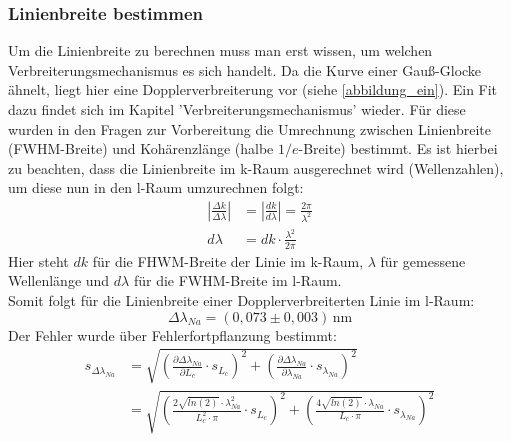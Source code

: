 \subsubsection{Linienbreite bestimmen}
Um die Linienbreite zu berechnen muss man erst wissen, um welchen Verbreiterungsmechanismus es sich handelt.
Da die Kurve einer Gauß-Glocke ähnelt, liegt hier eine Dopplerverbreiterung vor (siehe \ref{abbildung_ein}).
Ein Fit dazu findet sich im Kapitel 'Verbreiterungsmechanismus' wieder.
Für diese wurden in den Fragen zur Vorbereitung die Umrechnung zwischen Linienbreite (FWHM-Breite) und Kohärenzlänge (halbe $1/e$-Breite) bestimmt.
Es ist hierbei zu beachten, dass die Linienbreite im k-Raum ausgerechnet wird (Wellenzahlen), um diese nun in den l-Raum umzurechnen folgt:
\begin{align}
    \left|\frac{\Delta k}{\Delta \lambda}\right|&=\left|\frac{dk}{d\lambda}\right|=\frac{2\pi}{\lambda^2}\\
    d\lambda&=dk\cdot\frac{\lambda^2}{2\pi}
\end{align}
Hier steht $dk$ für die FHWM-Breite der Linie im k-Raum, $\lambda$ für gemessene Wellenlänge und $d\lambda$ für die FWHM-Breite im l-Raum.\\
Somit folgt für die Linienbreite einer Dopplerverbreiterten Linie im l-Raum:
\begin{equation}
    \Delta \lambda_{Na}=\left(0,073\pm0,003\right)\,\text{nm}
\end{equation}
Der Fehler wurde über Fehlerfortpflanzung bestimmt:
\begin{align}
    s_{\Delta \lambda_{Na}} &= \sqrt{\left(\frac{\partial \Delta \lambda_{Na}}{\partial L_c} \cdot s_{L_c}\right)^2+\left(\frac{\partial \Delta \lambda_{Na}}{\partial \lambda_{Na}} \cdot s_{\lambda_{Na}}\right)^2} \\
    &= \sqrt{\left(\frac{2 \sqrt{ln(2)} \cdot \lambda^2_{Na}}{L_c^2 \cdot \pi} \cdot s_{L_c}\right)^2+\left(\frac{4 \sqrt{ln(2)}\cdot \lambda_{Na}}{L_c \cdot \pi} \cdot s_{\lambda_{Na}}\right)^2}
\end{align}
\newpage
